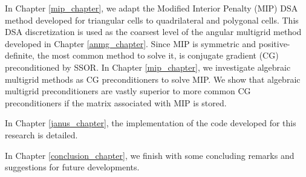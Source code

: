 In Chapter \ref{mip_chapter}, we adapt the Modified Interior Penalty (MIP) 
DSA method developed for triangular cells to quadrilateral and polygonal 
cells. This DSA discretization is used as the coarsest level of the angular 
multigrid method developed in Chapter \ref{anmg_chapter}. Since MIP is
symmetric and positive-definite, the most common method to solve it, is 
conjugate gradient (CG) preconditioned by SSOR. In Chapter \ref{mip_chapter}, we 
investigate algebraic multigrid methods as CG preconditioners to solve MIP. 
We show that algebraic multigrid preconditioners are vastly superior to more
common CG preconditioners if the matrix associated with MIP is stored.

In Chapter \ref{janus_chapter}, the implementation of the code
developed for this research is detailed.

In Chapter \ref{conclusion_chapter}, we finish with some concluding 
remarks and suggestions for future developments.
